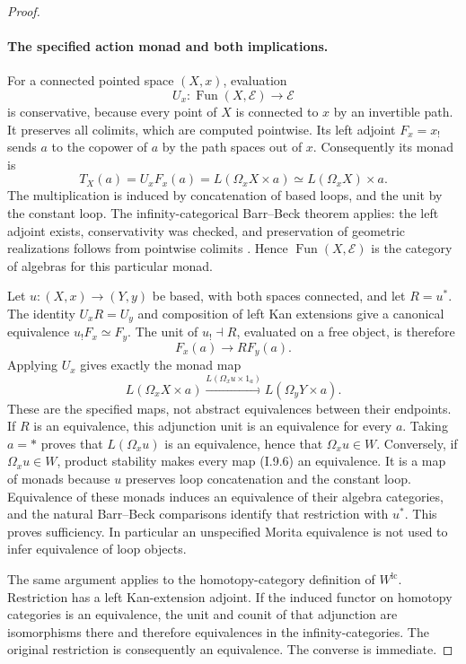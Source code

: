 \begin{proof}
\paragraph{The specified action monad and both implications.}
For a connected pointed space $(X,x)$, evaluation
\[
 U_x:\operatorname{Fun}(X,\mathcal E)\longrightarrow\mathcal E
\]
is conservative, because every point of $X$ is connected to $x$ by an invertible path. It preserves all colimits, which are computed pointwise. Its left adjoint $F_x=x_!$ sends $a$ to the copower of $a$ by the path spaces out of $x$. Consequently its monad is
\[
 T_X(a)=U_xF_x(a)
       =L(\Omega_xX\times a)
       \simeq L(\Omega_xX)\times a.
 \tag{I.9.5}
\]
The multiplication is induced by concatenation of based loops, and the unit by the constant loop. The infinity-categorical Barr--Beck theorem applies: the left adjoint exists, conservativity was checked, and preservation of geometric realizations follows from pointwise colimits \citep[Theorem~4.7.3.5]{I9LurieHA2017}. Hence $\operatorname{Fun}(X,\mathcal E)$ is the category of algebras for this particular monad.

Let $u:(X,x)\to(Y,y)$ be based, with both spaces connected, and let $R=u^*$. The identity $U_xR=U_y$ and composition of left Kan extensions give a canonical equivalence $u_!F_x\simeq F_y$. The unit of $u_!\dashv R$, evaluated on a free object, is therefore
\[
 F_x(a)\longrightarrow R F_y(a).
\]
Applying $U_x$ gives exactly the monad map
\[
 L(\Omega_xX\times a)\xrightarrow{L(\Omega_xu\times1_a)}
 L(\Omega_yY\times a).
 \tag{I.9.6}
\]
These are the specified maps, not abstract equivalences between their endpoints. If $R$ is an equivalence, this adjunction unit is an equivalence for every $a$. Taking $a=*$ proves that $L(\Omega_xu)$ is an equivalence, hence that $\Omega_xu\in W$. Conversely, if $\Omega_xu\in W$, product stability makes every map (I.9.6) an equivalence. It is a map of monads because $u$ preserves loop concatenation and the constant loop. Equivalence of these monads induces an equivalence of their algebra categories, and the natural Barr--Beck comparisons identify that restriction with $u^*$. This proves sufficiency. In particular an unspecified Morita equivalence is not used to infer equivalence of loop objects.

The same argument applies to the homotopy-category definition of $W^{\mathrm{lc}}$. Restriction has a left Kan-extension adjoint. If the induced functor on homotopy categories is an equivalence, the unit and counit of that adjunction are isomorphisms there and therefore equivalences in the infinity-categories. The original restriction is consequently an equivalence. The converse is immediate.


\end{proof}
